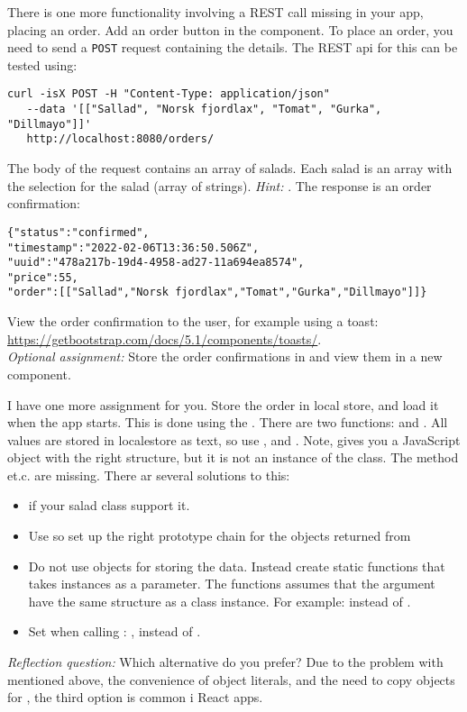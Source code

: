 \documentclass[fleqn, article, a4paper]{memoir}
\begin{document}
\begin{Assignments}
\item There is one more functionality involving a REST call missing in your app, placing an order. Add an order button in the  component. To place an order, you need to send a \texttt{POST} request containing the details. The REST api for this can be tested using:
\\ \noindent \begin{verbatim}
curl -isX POST -H "Content-Type: application/json" 
   --data '[["Sallad", "Norsk fjordlax", "Tomat", "Gurka", "Dillmayo"]]'
   http://localhost:8080/orders/
\end{verbatim}
\noindent The body of the request contains an array of salads. Each salad is an array with the selection for the salad (array of strings). \emph{Hint:} . The response is an order confirmation:
\begin{verbatim}
{"status":"confirmed",
"timestamp":"2022-02-06T13:36:50.506Z",
"uuid":"478a217b-19d4-4958-ad27-11a694ea8574",
"price":55,
"order":[["Sallad","Norsk fjordlax","Tomat","Gurka","Dillmayo"]]}
\end{verbatim}
\noindent View the order confirmation to the user, for example using a toast: \url{https://getbootstrap.com/docs/5.1/components/toasts/}. 
\\\emph{Optional assignment:} Store the order confirmations in  and view them in a new component.

\item I have one more assignment for you. Store the order in local store, and load it when the app starts. This is done using the . There are two functions:  and . All values are stored in localestore as text, so use , and . Note,  gives you a JavaScript object with the right structure, but it is not an instance of the  class. The  method et.c. are missing. There ar several solutions to this:
\begin{itemize}
\item {} if your salad class support it.
\item Use  so set up the right prototype chain for the objects returned from 
\item Do not use  objects for storing the data. Instead create static functions that takes  instances as a parameter. The functions assumes that the argument have the same structure as a  class instance. For example:  instead of .
\item Set  when calling : , instead of .
\end{itemize}
\emph{Reflection question:} Which alternative do you prefer? Due to the problem with  mentioned above, the convenience of object literals, and the need to copy objects for , the third option is common i React apps. 


\end{Assignments}
\end{document}
